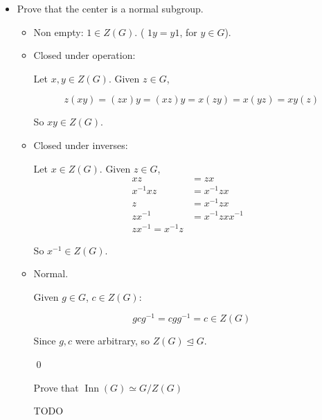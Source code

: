 \documentclass[11pt,oneside]{article}
\numberwithin{equation}{section}
\theoremstyle{definition}
\newtheorem{exercise}{Exercise}
\def\Inn{\operatorname{Inn}}
\begin{document}
\begin{solution}
\begin{enumerate}[(a)]
\begin{itemize}
        $$
        f_a \circ f_{a^{-1}} (x)  = f_a(a ^ {-1} x a) = a a^ {-1} x a a^{-1} = x = 1 x 1 = f_{1}(x)
        $$

        So $f_a ^ {-1} = f_{a^{-1}} \in \Inn(G)$.

        \qed

      \item
        Prove that the center is a normal subgroup.
        \begin{itemize}
        \item
          Non empty: $1 \in Z(G)$. ( $1y = y1$, for $y \in G$).
        \item
          Closed under operation:
          
          Let $x, y \in Z(G)$.  Given $z \in G$,

          $$
          z (xy) = (zx) y = (xz) y = x (zy) = x (yz) = xy(z)
          $$

          So $xy \in Z(G)$.
        \item
          Closed under inverses:

          Let $x \in Z(G)$.  Given $z \in G$,
          \begin{align*}
            xz & = zx & \\
            x^{-1} x z & = x^{-1} z x & \\
            z & = x^{-1} z x & \\
            z x ^ {-1} & = x^{-1} z x x ^ { -1} & \\
            z x ^ {-1} = x^ { -1} z
          \end{align*}

          So $x^{-1} \in Z(G)$.

        \item
          Normal.

          Given $ g \in G$, $c \in Z(G)$:

          $$
          g c g ^ {-1} = c g g^{-1} = c \in Z(G)
          $$

          Since $g,c $ were arbitrary, so $Z(G) \trianglelefteq G$.

          \qed

          Prove that $ \Inn(G) \simeq G / Z(G)$

          TODO

        \end{itemize}
      \end{itemize}
    \end{enumerate}
\end{solution}


\begin{comment}
  \begin{exercise}
    problem
  \end{exercise}
  \begin{solution}
    \begin{enumerate}[(a)]
    \item
      first answer
    \end{enumerate}
  \end{solution}
\end{comment}
\end{document}
